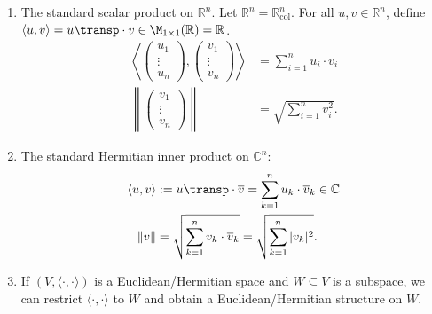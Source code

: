 \begin{enumerate}[label=\textbf{(\alph*)}]
    \item The standard scalar product on $\mathbb{R}^n$. Let $\mathbb{R}^n = \mathbb{R}^n_{\text{col}}$. For all $u, v \in \mathbb{R}^n$, define $\langle u, v \rangle = u\transp \cdot v \in \M_{1 \times 1}(\mathbb{R}) = \mathbb{R}$.
    \begin{align*}
        \left\langle \begin{pmatrix} u_1 \\ \vdots \\ u_n \end{pmatrix}, \begin{pmatrix} v_1 \\ \vdots \\ v_n \end{pmatrix} \right\rangle &= \sum_{i=1}^n u_i \cdot v_i \\
        \left\| \begin{pmatrix} v_1 \\ \vdots \\ v_n \end{pmatrix} \right\| &= \sqrt{\sum_{i=1}^n v_i^2}.
    \end{align*}
    
    \item The standard Hermitian inner product on $\mathbb{C}^n$:
    \begin{align*}
        \langle u, v \rangle &:= u\transp \cdot \overline{v} = \sum_{k=1}^n u_k \cdot \overline{v}_k \in \mathbb{C} \\
        \|v\| &= \sqrt{\sum_{k=1}^n v_k \cdot \overline{v}_k} = \sqrt{\sum_{k=1}^n |v_k|^2}.
    \end{align*}

    \item If $(V, \langle \cdot, \cdot \rangle)$ is a Euclidean/Hermitian space and $W \subseteq V$ is a subspace, we can restrict $\langle \cdot, \cdot \rangle$ to $W$ and obtain a Euclidean/Hermitian structure on $W$.
\end{enumerate}

